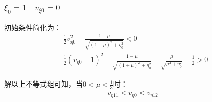 \subsubsection{$\xi_0=1\quad v_{\xi0}=0$}
初始条件简化为：
\begin{align}
    &\frac{1}{2}v_{\eta0}^2-\frac{1-\mu}{\sqrt{(1+\mu)^2+\eta_0^2}}<0\label{energy_11}
    \\&\frac{1}{2}(v_{\eta0}-1)^2-\frac{1-\mu}{\sqrt{(1+\mu)^2+\eta_0^2}}-\frac{\mu}{\sqrt{\mu^2+\eta_0^2}}-\frac{1}{2}>0\label{energy_12}
\end{align}

解以上不等式组可知，当$0<\mu<\frac{1}{3}$时：
\begin{align}
    v_{\eta11}<v_{\eta0}<v_{\eta12}\label{v_eta_1}
\end{align}

